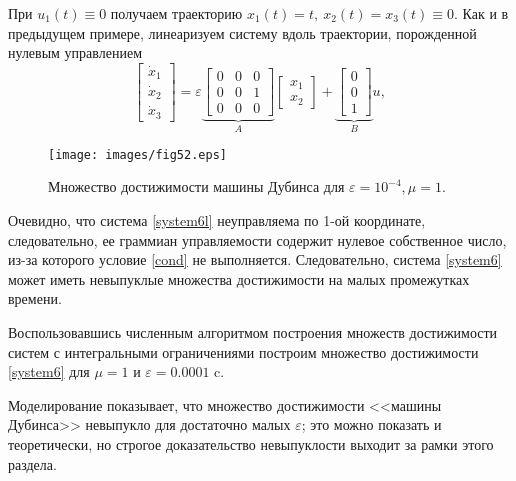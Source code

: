 \documentclass[../main.tex]{subfiles}
\begin{document}
 При $  u_1(t) \equiv 0 $ получаем траекторию $ x_1(t) = t, \ x_2(t) = x_3(t) \equiv 0 $. Как и в предыдущем примере, линеаризуем систему вдоль траектории, порожденной нулевым управлением
 \begin{equation}\label{system6l}
	 \left[ {\begin{array}{*{20}{c}}
			 {{{\dot x}_1}}\\
			 {{{\dot x}_2}}\\
			 {{{\dot x}_3}}
	 \end{array}} \right] = \varepsilon \underbrace {\left[ {\begin{array}{*{20}{c}}
				 0&0&0\\
				 0&0&1\\
				 0&0&0
		 \end{array}} \right]}_A\left[ {\begin{array}{*{20}{c}}
			 {{x_1}}\\
			 {{x_2}}
	 \end{array}} \right] + \underbrace {\left[ {\begin{array}{*{20}{c}}
				 0\\
				 0\\
				 1
		 \end{array}} \right]}_Bu ,
 \end{equation}
 \begin{figure}[h]
	 \centering
	 \texttt{[image: images/fig52.eps]}
	 \caption{Множество достижимости машины Дубинса для $\varepsilon = 10^{-4}, \mu = 1$.}
	 \label{fig:fig3}
 \end{figure}
 Очевидно, что система \eqref{system6l} неуправляема по 1-ой координате, следовательно, ее граммиан управляемости содержит нулевое собственное число, из-за которого условие \eqref{cond} не выполняется. Следовательно, система \eqref{system6} может иметь невыпуклые множества достижимости на малых промежутках времени.
 
 Воспользовавшись численным алгоритмом построения множеств достижимости систем с интегральными ограничениями \cite{GusevZykov2018} построим множество достижимости \eqref{system6} для $ \mu = 1  $ и $ \varepsilon = 0.0001  $ c. 
 
 Моделирование показывает, что множество достижимости <<машины Дубинса>> невыпукло для достаточно малых $ \varepsilon $; это можно показать и теоретически, но строгое доказательство невыпуклости выходит за рамки этого раздела.
 
\end{document}
